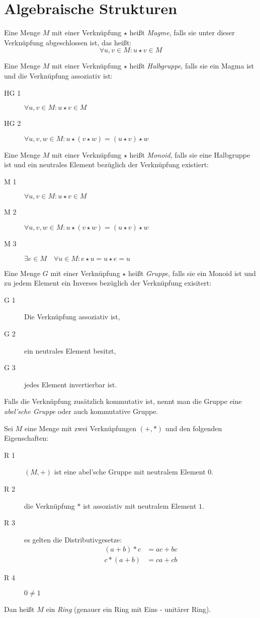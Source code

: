 \chapter{Algebraische Strukturen}
Eine Menge $M$ mit einer Verknüpfung $\star$ heißt \emph{Magme}, falls sie unter dieser Verknüpfung abgeschlossen ist, das heißt:
\begin{equation*}
  \forall u,v \in M: u\star v\in M
\end{equation*}

Eine Menge $M$ mit einer Verknüpfung $\star$ heißt \emph{Halbgruppe}, falls sie ein Magma ist und die Verknüpfung assoziativ ist:
\begin{description}
  \item[HG 1] $\forall u,v \in M: u\star v\in M$
  \item[HG 2] $\forall u,v,w \in M: u\star(v\star w)=(u\star v)\star w$
\end{description}

Eine Menge $M$ mit einer Verknüpfung $\star$ heißt \emph{Monoid}, falls sie eine Halbgruppe ist und ein neutrales Element bezüglich der Verknüpfung existiert:
\begin{description}
  \item[M 1] $\forall u,v \in M: u\star v\in M$
  \item[M 2] $\forall u,v,w \in M: u\star(v\star w)=(u\star v)\star w$
  \item[M 3] $\exists e \in M \quad \forall u\in M: e\star u=u\star e = u$
\end{description}

Eine Menge $G$ mit einer Verknüpfung $\star$ heißt \emph{Gruppe}, falls sie ein Monoid ist und zu jedem Element ein Inverses bezüglich der Verknüpfung exisitert:
\begin{description}
  \item[G 1] Die Verknüpfung assoziativ ist,
  \item[G 2] ein neutrales Element besitzt,
  \item[G 3] jedes Element invertierbar ist.
\end{description}
Falls die Verknüpfung zusätzlich kommutativ ist, nennt man die Gruppe eine \emph{abel'sche Gruppe} oder auch kommutative Gruppe.

Sei $M$ eine Menge mit zwei Verknüpfungen $(+,*)$ und den folgenden Eigenschaften:
\begin{description}
  \item[R 1] $(M,+)$ ist eine abel'sche Gruppe mit neutralem Element $0$.
  \item[R 2] die Verknüpfung $*$ ist assoziativ mit neutralem Element $1$.
  \item[R 3] es gelten die Distributivgesetze:
  \begin{align*}
    (a+b)* c&=ac+bc\\
    c*(a+b)&=ca+cb
  \end{align*}
  \item[R 4] $0\neq 1$
\end{description}
Dan heißt $M$ ein \emph{Ring} (genauer ein Ring mit Eins - unitärer Ring).

